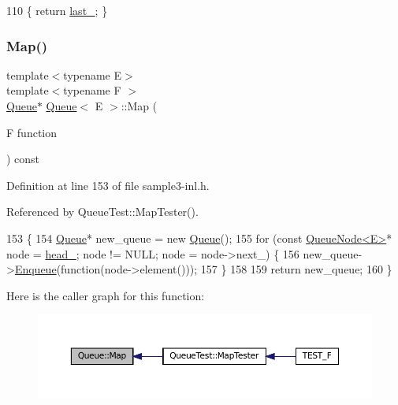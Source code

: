 \begin{DoxyCode}
110 \{ \textcolor{keywordflow}{return} \hyperlink{classQueue_a7466dca4f96147c9124af582ab170df0}{last\_}; \}
\end{DoxyCode}
\mbox{\label{classQueue_a904a696292fc593adc6fd21fb229d760}} 
\subsubsection{\texorpdfstring{Map()}{Map()}}
{\footnotesize\ttfamily template$<$typename E$>$ \\
template$<$typename F $>$ \\
\hyperlink{classQueue}{Queue}$\ast$ \hyperlink{classQueue}{Queue}$<$ E $>$\+::Map (\begin{DoxyParamCaption}\item[{F}]{function }\end{DoxyParamCaption}) const\hspace{0.3cm}{\ttfamily [inline]}}



Definition at line 153 of file sample3-\/inl.\+h.



Referenced by Queue\+Test\+::\+Map\+Tester().


\begin{DoxyCode}
153                                \{
154     \hyperlink{classQueue}{Queue}* new\_queue = \textcolor{keyword}{new} \hyperlink{classQueue_ab09891e54b51dc677ee6efb350687ae4}{Queue}();
155     \textcolor{keywordflow}{for} (\textcolor{keyword}{const} \hyperlink{classQueueNode}{QueueNode<E>}* node = \hyperlink{classQueue_abf9219bcea800d26e8bfdb4777d98729}{head\_}; node != NULL; node = node->next\_) \{
156       new\_queue->\hyperlink{classQueue_abaa2e7175457307bca74f5562cbdaaa9}{Enqueue}(\textcolor{keyword}{function}(node->element()));
157     \}
158 
159     \textcolor{keywordflow}{return} new\_queue;
160   \}
\end{DoxyCode}
Here is the caller graph for this function\+:
\nopagebreak
\begin{figure}[H]
\begin{center}
\leavevmode
\includegraphics[width=350pt]{classQueue_a904a696292fc593adc6fd21fb229d760_icgraph}
\end{center}
\end{figure}
\mbox{\label{classQueue_adf6f3eb046365f1b67b6c0bd5da2da59}} 
